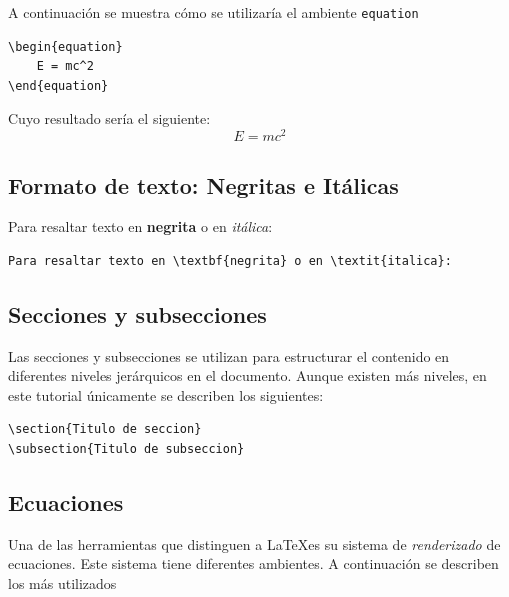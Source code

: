 \documentclass[12pt,letterpaper,spanish, twoside]{article}
\begin{document}
\ej A continuación se muestra cómo se utilizaría el ambiente \texttt{equation}

\begin{lstlisting}[caption={Ejemplo básico de ambiente equation}, label={lst:basic:eq}]
\begin{equation}
    E = mc^2
\end{equation}
\end{lstlisting}


Cuyo resultado sería el siguiente:
\begin{equation}
 E=mc^2    
\end{equation}

\subsection{Formato de texto: Negritas e Itálicas}
Para resaltar texto en \textbf{negrita} o en \textit{itálica}:
\begin{lstlisting}[caption={Formato en negritas e itálicas}, label={lst:basic:font}]
Para resaltar texto en \textbf{negrita} o en \textit{italica}:
\end{lstlisting}


\subsection{Secciones y subsecciones}
Las secciones y subsecciones se utilizan para estructurar el contenido en diferentes niveles jerárquicos en el documento. Aunque existen más niveles, en este tutorial únicamente se describen los siguientes:
\begin{lstlisting}[caption={Ejemplos de secciones y subsecciones en un documento}]
\section{Titulo de seccion}
\subsection{Titulo de subseccion}
\end{lstlisting}

\subsection{Ecuaciones}
Una de las herramientas que distinguen a \LaTeX es su sistema de \textit{renderizado} de ecuaciones. Este sistema tiene diferentes ambientes. A continuación se describen los más utilizados
\end{document}
